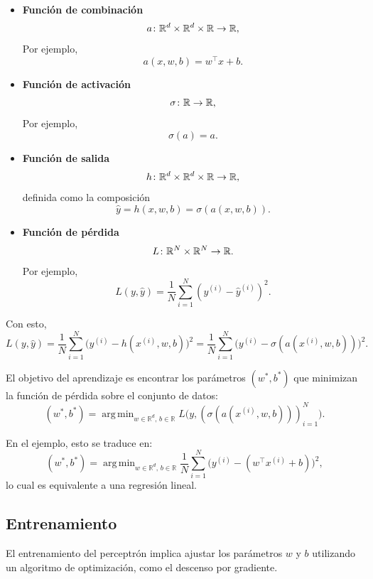 \documentclass[a4,11pt]{aleph-notas}
\DeclareMathOperator*{\argmin}{arg\,min}
\begin{document}
\begin{itemize}[leftmargin=*]
    \item \textbf{Función de combinación}
    \[
        a\colon \mathbb{R}^d \times \mathbb{R}^d \times \mathbb{R} \rightarrow \mathbb{R},
    \]
    Por ejemplo,
    \[
        a(x,w,b) = w^\top x + b.
    \]

    \item \textbf{Función de activación}
    \[
        \sigma\colon \mathbb{R} \rightarrow \mathbb{R},
    \]
    Por ejemplo,
    \[
        \sigma(a) = a.
    \]

    \item \textbf{Función de salida}
    \[
        h\colon \mathbb{R}^d \times \mathbb{R}^d \times \mathbb{R}  \rightarrow \mathbb{R},
    \]
    definida como la composición
    \[
        \hat y = h(x,w,b) = \sigma (a(x,w,b)).
    \]

    \item \textbf{Función de pérdida}
    \[
        L\colon \mathbb{R}^N \times \mathbb{R}^N \rightarrow \mathbb{R}.
    \]
    Por ejemplo,
    \[
        L(y,\hat y) = \frac{1}{N} \sum_{i=1}^N (y^{(i)} - \hat y^{(i)})^2.
    \]
\end{itemize}

Con esto, 
\[
    L(y, \hat y)
    = \frac{1}{N} \sum_{i=1}^N \bigl(y^{(i)} - h(x^{(i)},w,b)\bigr)^2=
    \frac{1}{N} \sum_{i=1}^N \bigl(y^{(i)} - \sigma(a(x^{(i)},w,b))\bigr)^2.
\]

El objetivo del aprendizaje es encontrar los parámetros \((w^\ast,b^\ast)\)
que minimizan la función de pérdida sobre el conjunto de datos:
\[
    (w^\ast,b^\ast)
    =
    \argmin_{w \in \mathbb{R}^d,\, b \in \mathbb{R}}
    L\bigl(y, (\sigma(a(x^{(i)},w,b)))_{i=1}^N\bigr).
\]

En el ejemplo, esto se traduce en:
\[
    (w^\ast,b^\ast)
    =
    \argmin_{w \in \mathbb{R}^d,\, b \in \mathbb{R}}
    \frac{1}{N} \sum_{i=1}^N \bigl(y^{(i)} - (w^\top x^{(i)} + b)\bigr)^2,
\]
lo cual es equivalente a una regresión lineal.

\subsection*{Entrenamiento}

El entrenamiento del perceptrón implica ajustar los parámetros \(w\) y \(b\) utilizando un algoritmo de optimización, como el descenso por gradiente.
\end{document}
